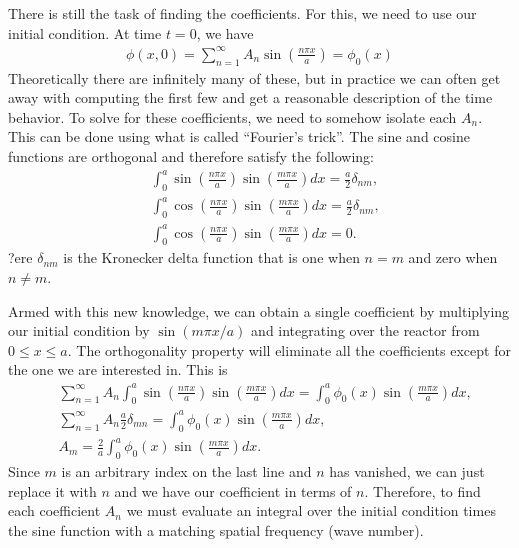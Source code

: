 There is still the task of finding the coefficients. For this, we need to use our initial condition. At time $t = 0$, we have
\begin{align}
  \phi(x,0) = \sum_{n=1}^\infty A_n \sin \left( \frac{ n \pi x }{ a } \right) = \phi_0(x)
\end{align}
Theoretically there are infinitely many of these, but in practice we can often get away with computing the first few and get a reasonable description of the time behavior. To solve for these coefficients, we need to somehow isolate each $A_n$. This can be done using what is called ``Fourier's trick''. The sine and cosine functions are orthogonal and therefore satisfy the following:
\begin{subequations}
\begin{align}
  &\int_0^a \sin\left( \frac{n\pi x}{a} \right) \sin\left( \frac{m\pi x}{a} \right) dx = \frac{a}{2} \delta_{nm}, \\
  &\int_0^a \cos\left( \frac{n\pi x}{a} \right) \sin\left( \frac{m\pi x}{a} \right) dx = \frac{a}{2} \delta_{nm}, \\  
  &\int_0^a \cos\left( \frac{n\pi x}{a} \right) \sin\left( \frac{m\pi x}{a} \right) dx = 0.  
\end{align}
\end{subequations}
?ere $\delta_{nm}$ is the Kronecker delta function that is one when $n = m$ and zero when $n \ne m$.

Armed with this new knowledge, we can obtain a single coefficient by multiplying our initial condition by $\sin(m\pi x/a)$ and integrating over the reactor from $0 \le x \le a$. The orthogonality property will eliminate all the coefficients except for the one we are interested in. This is
\begin{align}
  &\sum_{n=1}^\infty A_n \int_0^a \sin \left( \frac{ n \pi x }{ a } \right) \sin \left( \frac{ m \pi x }{ a } \right) dx = \int_0^a \phi_0(x) \sin \left( \frac{ m \pi x }{ a } \right) dx, \nonumber \\
   &\sum_{n=1}^\infty A_n \frac{a}{2} \delta_{mn} = \int_0^a \phi_0(x) \sin \left( \frac{ m \pi x }{ a } \right) dx, \nonumber \\ 
   &A_m = \frac{2}{a} \int_0^a \phi_0(x) \sin \left( \frac{ m \pi x }{ a } \right) dx.
\end{align}
Since $m$ is an arbitrary index on the last line and $n$ has vanished, we can just replace it with $n$ and we have our coefficient in terms of $n$. Therefore, to find each coefficient $A_n$ we must evaluate an integral over the initial condition times the sine function with a matching spatial frequency (wave number). 

